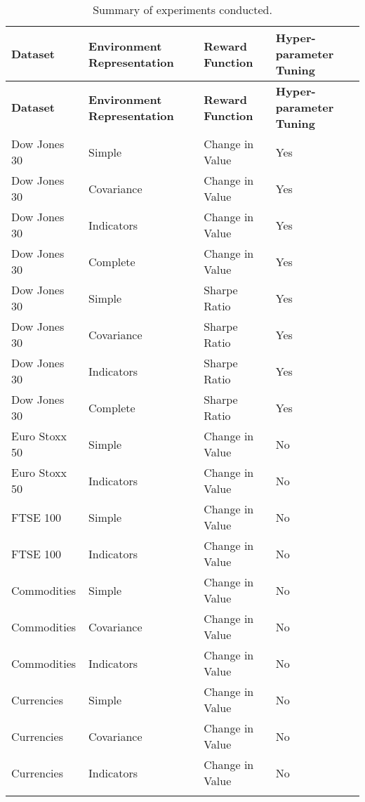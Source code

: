 \begin{longtable}{|p{3cm}|p{3cm}|p{3.5cm}|p{3.5cm}|}
    \hline
    \textbf{Dataset} & \textbf{Environment Representation} & \textbf{Reward Function} & \textbf{Hyper-parameter Tuning} \\ \midrule
    \endfirsthead

    \hline
    \textbf{Dataset} & \textbf{Environment Representation} & \textbf{Reward Function} & \textbf{Hyper-parameter Tuning} \\ \midrule
    \endhead

    \endfoot
    \hline
    Dow Jones 30    & Simple         & Change in Value & Yes \\ \hline
    Dow Jones 30    & Covariance     & Change in Value & Yes \\ \hline
    Dow Jones 30    & Indicators     & Change in Value & Yes \\ \hline
    Dow Jones 30    & Complete       & Change in Value & Yes \\ \hline
    Dow Jones 30    & Simple         & Sharpe Ratio    & Yes \\ \hline
    Dow Jones 30    & Covariance     & Sharpe Ratio    & Yes \\ \hline
    Dow Jones 30    & Indicators     & Sharpe Ratio    & Yes \\ \hline
    Dow Jones 30    & Complete       & Sharpe Ratio    & Yes \\ \hline
    Euro Stoxx 50   & Simple         & Change in Value & No  \\ \hline
    Euro Stoxx 50   & Indicators     & Change in Value & No  \\ \hline
    FTSE 100        & Simple         & Change in Value & No  \\ \hline
    FTSE 100        & Indicators     & Change in Value & No  \\ \hline
    Commodities     & Simple         & Change in Value & No  \\ \hline
    Commodities     & Covariance     & Change in Value & No  \\ \hline
    Commodities     & Indicators     & Change in Value & No  \\ \hline
    Currencies      & Simple         & Change in Value & No  \\ \hline
    Currencies      & Covariance     & Change in Value & No  \\ \hline
    Currencies      & Indicators     & Change in Value & No  \\ \hline
\caption{Summary of experiments conducted.}
\label{tab:experiments-summary}
\end{longtable}
